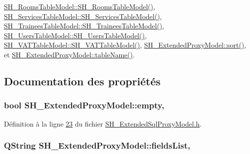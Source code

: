 \hyperlink{classSH__RoomsTableModel_a722f2c372e27e502e73f045b38301368}{S\-H\-\_\-\-Rooms\-Table\-Model\-::\-S\-H\-\_\-\-Rooms\-Table\-Model()}, \hyperlink{classSH__ServicesTableModel_ab21926661cb9374e9116a3236800caa7}{S\-H\-\_\-\-Services\-Table\-Model\-::\-S\-H\-\_\-\-Services\-Table\-Model()}, \hyperlink{classSH__TraineesTableModel_aa28ee863afaf81efdc5c6979060321e3}{S\-H\-\_\-\-Trainees\-Table\-Model\-::\-S\-H\-\_\-\-Trainees\-Table\-Model()}, \hyperlink{classSH__UsersTableModel_a04927caa4b15b925b2f30f362af25433}{S\-H\-\_\-\-Users\-Table\-Model\-::\-S\-H\-\_\-\-Users\-Table\-Model()}, \hyperlink{classSH__VATTableModel_a64afdd54a316c5c4dbf7f700de3f5708}{S\-H\-\_\-\-V\-A\-T\-Table\-Model\-::\-S\-H\-\_\-\-V\-A\-T\-Table\-Model()}, \hyperlink{classSH__ExtendedProxyModel_a2d5fdb58bf67879e3f3130619b93104a}{S\-H\-\_\-\-Extended\-Proxy\-Model\-::sort()}, et \hyperlink{classSH__ExtendedProxyModel_abb133e196ca7cf90b9c9b57263e898d6}{S\-H\-\_\-\-Extended\-Proxy\-Model\-::table\-Name()}.



\subsection{Documentation des propriétés}
\hypertarget{classSH__ExtendedProxyModel_a9e22d17af7776aca8052084cc33c3442}{
\subsubsection[{empty}]{\setlength{\rightskip}{0pt plus 5cm}bool S\-H\-\_\-\-Extended\-Proxy\-Model\-::empty\hspace{0.3cm}{\ttfamily [read]}, {\ttfamily [inherited]}}}\label{classSH__ExtendedProxyModel_a9e22d17af7776aca8052084cc33c3442}


Définition à la ligne \hyperlink{SH__ExtendedSqlProxyModel_8h_source_l00023}{23} du fichier \hyperlink{SH__ExtendedSqlProxyModel_8h_source}{S\-H\-\_\-\-Extended\-Sql\-Proxy\-Model.\-h}.

\hypertarget{classSH__ExtendedProxyModel_a15e779ba92384a57442d6bd79ef3d1d1}{
\subsubsection[{fields\-List}]{\setlength{\rightskip}{0pt plus 5cm}Q\-String S\-H\-\_\-\-Extended\-Proxy\-Model\-::fields\-List\hspace{0.3cm}{\ttfamily [read]}, {\ttfamily [inherited]}}}\label{classSH__ExtendedProxyModel_a15e779ba92384a57442d6bd79ef3d1d1}


